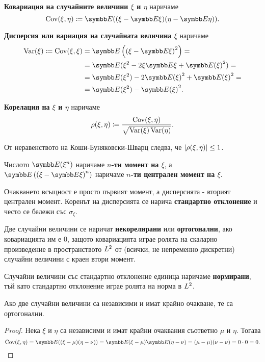 \documentclass[numbers=endperiod, bibliography=totocnumbered]{scrartcl}
\begin{document}
\begin{definition}
  \textbf{Ковариация на случайните величини \( \xi \) и \( \eta \)} наричаме
  \begin{equation*}
    \Cov(\xi, \eta)
    \coloneqq
    \Expect((\xi - \Expect \xi) (\eta - \Expect \eta)).
  \end{equation*}

  \textbf{Дисперсия или вариация на случайната величина \( \xi \)} наричаме
  \begin{align*}
    \Var(\xi)
    \coloneqq
    \Cov(\xi, \xi)
    &=
    \Expect \left({(\xi - \Expect \xi)}^2 \right)
    = \\ &=
    \Expect(\xi^2 - 2 \xi \Expect \xi + {\Expect(\xi)}^2)
    = \\ &=
    \Expect(\xi^2) - 2 {\Expect(\xi)}^2 + {\Expect(\xi)}^2
    = \\ &=
    \Expect(\xi^2) - {\Expect(\xi)}^2.
  \end{align*}

  \textbf{Корелация на \( \xi \) и \( \eta \)} наричаме
  \begin{equation*}
    \operatorname{\rho}(\xi, \eta)
    \coloneqq
    \frac {\operatorname{Cov}(\xi, \eta)} {\sqrt{\operatorname{Var}(\xi) \operatorname{Var}(\eta)}}.
  \end{equation*}

  От неравенството на Коши-Буняковски-Шварц следва, че \( \left\vert \operatorname{\rho}(\xi, \eta) \right\vert \leq 1 \).

  Числото \( \Expect(\xi^n) \) наричаме \textbf{\( n \)-ти момент на \( \xi \)}, а \( \Expect \left( {(\xi - \Expect \xi)}^n \right) \) наричаме \textbf{\( n \)-ти централен момент на \( \xi \)}.

  Очакването всъщност е просто първият момент, а дисперсията - вторият централен момент. Коренът на дисперсията се нарича \textbf{стандартно отклонение} и често се бележи със \( \sigma_\xi \).

  Две случайни величини се наричат \textbf{некорелирани} или \textbf{ортогонални}, ако ковариацията им е \( 0 \), защото ковариацията играе ролята на скаларно произведение в пространството \( L^2 \) от (всички, не непременно дискретни) случайни величини с краен втори момент.

  Случайни величини със стандартно отклонение единица наричаме \textbf{нормирани}, тъй като стандартно отклонение играе ролята на норма в \( L^2 \).
\end{definition}

\begin{proposition}\label{thm:independence_implies_orthogonality}
  Ако две случайни величини са независими и имат крайно очакване, те са ортогонални.
\end{proposition}
\begin{proof}
  Нека \( \xi \) и \( \eta \) са независими и имат крайни очаквания съответно \( \mu \) и \( \eta \). Тогава
  \begin{equation*}
    \Cov(\xi, \eta)
    =
    \Expect((\xi - \mu) (\eta - \nu))
    =
    \Expect(\xi - \mu) \Expect(\eta - \nu)
    =
    (\mu - \mu) (\nu - \nu)
    =
    0 \cdot 0
    =
    0.
  \end{equation*}
\end{proof}
\end{document}
